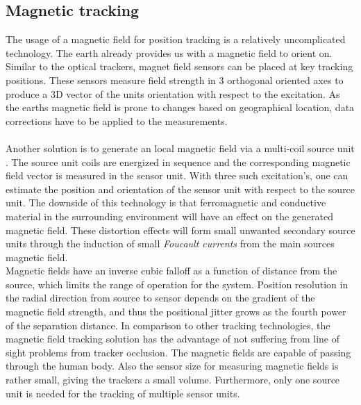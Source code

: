 \subsection{Magnetic tracking}
The usage of a magnetic field for position tracking is a relatively uncomplicated technology. The earth already provides us with a magnetic field to orient on. Similar to the optical trackers, magnet field sensors can be placed at key tracking positions. These sensors measure field strength in 3 orthogonal oriented axes to produce a 3D vector of the units orientation with respect to the excitation. As the earths magnetic field is prone to changes based on geographical location, data corrections have to be applied to the measurements.\\\\Another solution is to generate an local magnetic field via a multi-coil source unit \cite{Raab.1979}. The source unit coils are energized in sequence and the corresponding magnetic field vector is measured in the sensor unit. With three such excitation's, one can estimate the position and orientation of the sensor unit with respect to the source unit. The downside of this technology is that ferromagnetic and conductive material in the surrounding environment will have an effect on the generated magnetic field. These distortion effects will form small unwanted secondary source units through the induction of small \textit{Foucault currents} from the main sources magnetic field.\\
Magnetic fields have an inverse cubic falloff as a function of distance from the source, which limits the range of operation for the system.
Position resolution in the radial direction from source to sensor depends on the gradient of the magnetic field strength, and thus the positional jitter grows as the fourth power of the separation distance.
In comparison to other tracking technologies, the magnetic field tracking solution has the advantage of not suffering from line of sight problems from tracker occlusion. The magnetic fields are capable of passing through the human body. Also the sensor size for measuring magnetic fields is rather small, giving the trackers a small volume. Furthermore, only one source unit is needed for the tracking of multiple sensor units.
\newpage
